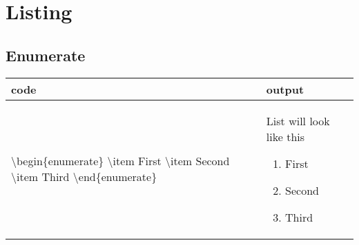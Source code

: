 \documentclass[a4paper, 10pt]{book}
\begin{document}
\tableofcontents
\chapter[Listing Items]{Listing}
\section[Enumerate]{Enumerate}
\begin{table}[!h]
	\begin{tabularx}{10cm}{|X|X|}
		\hline
		code & output \\
		\hline
		\textbackslash begin\{enumerate\}   \newline
		\textbackslash item First   \newline        %
		\textbackslash item Second  \newline
		\textbackslash item Third   \newline
		\textbackslash end\{enumerate\} \newline
		     &
		List will look like this
		\begin{enumerate}
			\item First
			\item Second
			\item Third
		\end{enumerate}
		\\
		\hline
	\end{tabularx}
\end{table}
\end{document}
